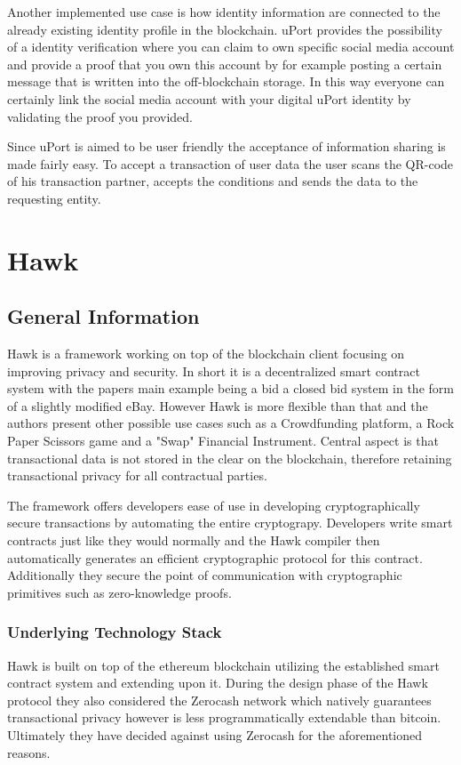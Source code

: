 Another implemented use case is how identity information are connected to the already existing identity profile in the blockchain. uPort provides the possibility of a identity verification where you can claim to own specific social media account and provide a proof that you own this account by  for example posting a certain message that is written into the off-blockchain storage. In this way everyone can certainly link the social media account with your digital uPort identity by validating the proof you provided.

Since uPort is aimed to be user friendly the acceptance of information sharing is made fairly easy. To accept a transaction of user data the user scans the QR-code of his transaction partner, accepts the conditions and sends the data to the requesting entity.

\section{Hawk}
\subsection{General Information}
Hawk is a framework working on top of the blockchain client focusing on improving privacy and security. In short it is a decentralized smart contract system with the papers main example being a bid a closed bid system in the form of a slightly modified eBay.\cite[p.840]{Hawk} However Hawk is more flexible than that and the authors present other possible use cases such as a Crowdfunding platform, a Rock Paper Scissors game and a "Swap" Financial Instrument.\cite[p.852]{Hawk} Central aspect is that transactional data is not stored in the clear on the blockchain, therefore retaining transactional privacy for all contractual parties.\cite[p.840]{Hawk}

The framework offers developers ease of use in developing cryptographically secure transactions by automating the entire cryptograpy. Developers write smart contracts just like they would normally and the Hawk compiler then automatically generates an efficient cryptographic protocol for this contract. Additionally they secure the point of communication with cryptographic primitives such as zero-knowledge proofs.\cite[p.839-840]{Hawk}

\subsubsection{Underlying Technology Stack}
Hawk is built on top of the ethereum blockchain utilizing the established smart contract system and extending upon it. During the design phase of the Hawk protocol they also considered the Zerocash network which natively guarantees transactional privacy however is less programmatically extendable than bitcoin. Ultimately they have decided against using Zerocash for the aforementioned reasons.\cite[p.841]{Hawk}

